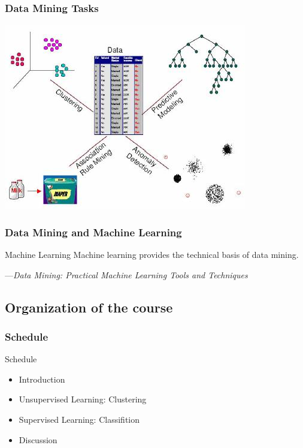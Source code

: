 \documentclass[UTF8]{beamer}\usepackage[]{graphicx}\usepackage[]{color}
\begin{document}
\begin{frame}
  \frametitle{Data Mining Tasks}
\centerline{\includegraphics[height=.6\textheight]{dmtasks.jpg}}
\end{frame}

\begin{frame}[fragile]
  \frametitle{Data Mining and Machine Learning}
\begin{block}{Machine Learning}
  Machine learning provides the technical basis of data mining.

---\textit{Data Mining: Practical Machine Learning Tools and Techniques}
\end{block}
\end{frame}

\subsection{Organization of the course}

\begin{frame}
  \frametitle{Schedule}

  \begin{block}{Schedule}
\begin{itemize}
\item Introduction
\item Unsupervised Learning: Clustering
\item Supervised Learning: Classifition
\item Discussion
\end{itemize}
  \end{block}
\end{frame}
\end{document}
